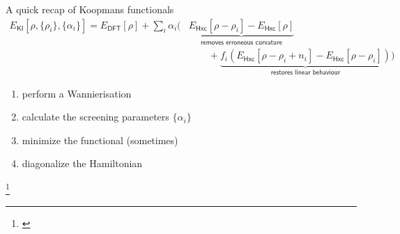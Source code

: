\documentclass[xcolor=table,aspectratio=169]{beamer}
\newcommand\blfootcite[1]{%
  \begingroup
  \renewcommand\thefootnote{}\footnote{\hspace{-4ex}\cite{#1}}%
  \addtocounter{footnote}{-1}%
  \endgroup
}
\numberwithin{equation}{section}
\begin{document}
% 
% 
\begin{frame}{A quick recap of Koopmans functionals}
   \begin{align*}
      E_\mathsf{KI}[\rho,{\{\rho_i\}}, {\{\alpha_i\}}]
      = {E_\mathsf{DFT}[\rho]}
      + \sum_i
      {\alpha_i}
      \biggl( &\underbrace{
      E_\mathsf{Hxc} [\rho-{\rho_i}] -E_\mathsf{Hxc}[\rho]}_{{\textsf{removes erroneous curvature}}}\nonumber                                                                                             \\
              & \qquad + \underbrace{f_i \left( E_\mathsf{Hxc}[\rho-{\rho_i}+{n_i}] -E_\mathsf{Hxc}[\rho-{\rho_i}] \right)}_{{\textsf{restores linear behaviour}}}
      \biggr)
   \end{align*}

   \begin{enumerate}[<+(2)->]
      \item perform a Wannierisation
      \item calculate the screening parameters $\{\alpha_i\}$
      \item minimize the functional (sometimes)
      \item diagonalize the Hamiltonian
   \end{enumerate}


   \blfootcite{Linscott2023}

\end{frame}
\end{document}
